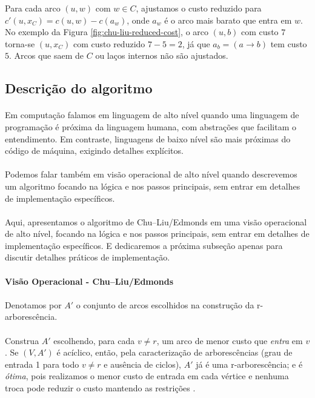 \documentclass[12pt,a4paper]{article}
\begin{document}
Para cada arco \((u,w)\) com \(w\in C\), ajustamos o custo reduzido para \(c'(u,x_C)=c(u,w)-c(a_w)\), onde \(a_w\) é o arco mais barato que entra em \(w\). No exemplo da Figura \ref{fig:chu-liu-reduced-cost}, o arco \((u,b)\) com custo \(7\) torna-se \((u,x_C)\) com custo reduzido \(7-5=2\), já que \(a_b=(a\to b)\) tem custo \(5\). Arcos que saem de \(C\) ou laços internos não são ajustados.

\subsection{Descrição do algoritmo}

\paragraph{}
Em computação falamos em linguagem de alto nível quando uma linguagem de programação é próxima da linguagem humana, com abstrações que facilitam o entendimento. Em contraste, linguagens de baixo nível são mais próximas do código de máquina, exigindo detalhes explícitos. 

\paragraph{}
Podemos falar também em visão operacional de alto nível quando descrevemos um algoritmo focando na lógica e nos passos principais, sem entrar em detalhes de implementação específicos.

\paragraph{}
Aqui, apresentamos o algoritmo de Chu–Liu/Edmonds em uma visão operacional de alto nível, focando na lógica e nos passos principais, sem entrar em detalhes de implementação específicos. E dedicaremos a próxima subseção apenas para discutir detalhes práticos de implementação.

\paragraph{Visão Operacional - Chu–Liu/Edmonds}
\paragraph{}
Denotamos por \(A'\) o conjunto de arcos escolhidos na construção da r-arborescência. 

\paragraph{}
Construa \(A'\) escolhendo, para cada \(v\neq r\), um arco de menor custo que \emph{entra} em \(v\). Se \((V,A')\) é acíclico, então, pela caracterização de arborescências (grau de entrada 1 para todo \(v\neq r\) e ausência de ciclos), \(A'\) já é uma r‑arborescência; e é \emph{ótima}, pois realizamos o menor custo de entrada em cada vértice e nenhuma troca pode reduzir o custo mantendo as restrições \cite[Sec.~4.9]{kleinberg2006}. 
\end{document}

